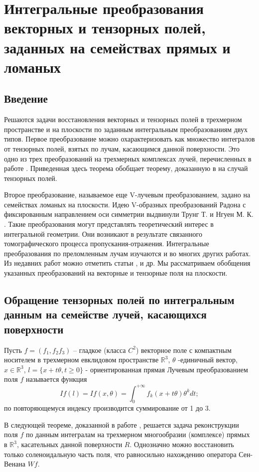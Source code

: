\chapter{Интегральные преобразования векторных и тензорных полей, заданных на семействах прямых и ломаных}

\section{Введение}
Решаются задачи восстановления векторных и тензорных полей в трехмерном пространстве и на плоскости по заданным интегральным преобразованиям двух типов. Первое преобразование можно охарактеризовать как множество интегралов от тензорных полей, взятых по лучам, касающимся данной поверхности. Это одно из трех преобразований на трехмерных комплексах лучей, перечисленных в работе \cite{Medzhidov}. Приведенная здесь теорема обобщает теорему, доказанную в \cite{Medzhidov} на случай тензорных полей.

Второе преобразование, называемое еще V-лучевым преобразованием, задано на семействах ломаных на плоскости. Идею V-образных преобразований Радона с фиксированным направлением оси симметрии выдвинули Трунг Т. и Нгуен М. К. \cite{Truong}. Такие преобразования могут представлять теоретический интерес в интегральной геометрии. Они возникают в результате связанного томографического процесса пропускания-отражения. Интегральные преобразования по преломленным лучам изучаются и во многих других работах. Из недавних работ можно отметить статьи \cite{Sharafutdinov}, \cite{Ambartsoumian}  и др.
Мы рассматриваем обобщения указанных преобразований на векторные и тензорные поля на плоскости.

\section{Обращение тензорных полей по интегральным данным на семействе лучей, касающихся поверхности}

Пусть $f=\left(f_1, f_2 f_3\right)$ -- гладкое (класса $C^2$) векторное поле с компактным носителем в трехмерном евклидовом пространстве $\mathbb R^3$, $\theta$ -единичный вектор, $x\in \mathbb R^3$,  $l=\{x+t\theta, t\geq 0\}$ - ориентированная прямая Лучевым преобразованием поля $f$ называется функция
$$If(l)=If(x,\theta)=\int_0^{+\infty}f_k(x+t\theta)\theta^kdt;$$
по повторяющемуся индексу производится суммирование от 1 до 3.

В следующей теореме, доказанной в работе \cite{Medzhidov}, решается задача реконструкции поля  $f$ по данным интегралам   на трехмерном многообразии (комплексе) прямых в  $\mathbb R^3$, касательных данной поверхности $R$. Однозначно можно восстановить только соленоидальную часть поля, что  равносильно нахождению оператора Сен-Венана $Wf$.

